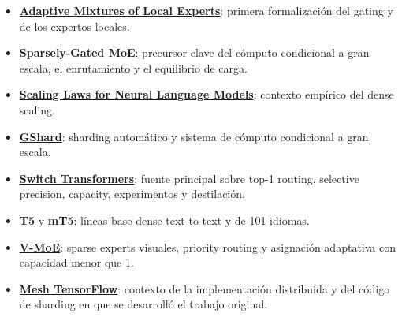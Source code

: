 {\small
\begin{itemize}[nosep,leftmargin=*]
  \item \href{https://doi.org/10.1162/neco.1991.3.1.79}{\textbf{Adaptive Mixtures of Local Experts}}: primera formalización del gating y de los expertos locales.
  \item \href{https://arxiv.org/abs/1701.06538}{\textbf{Sparsely-Gated MoE}}: precursor clave del cómputo condicional a gran escala, el enrutamiento y el equilibrio de carga.
  \item \href{https://arxiv.org/abs/2001.08361}{\textbf{Scaling Laws for Neural Language Models}}: contexto empírico del dense scaling.
  \item \href{https://arxiv.org/abs/2006.16668}{\textbf{GShard}}: sharding automático y sistema de cómputo condicional a gran escala.
  \item \href{https://arxiv.org/abs/2101.03961}{\textbf{Switch Transformers}}: fuente principal sobre top-1 routing, selective precision, capacity, experimentos y destilación.
  \item \href{https://arxiv.org/abs/1910.10683}{\textbf{T5}} y \href{https://arxiv.org/abs/2010.11934}{\textbf{mT5}}: líneas base dense text-to-text y de 101 idiomas.
  \item \href{https://arxiv.org/abs/2106.05974}{\textbf{V-MoE}}: sparse experts visuales, priority routing y asignación adaptativa con capacidad menor que 1.
  \item \href{https://github.com/tensorflow/mesh}{\textbf{Mesh TensorFlow}}: contexto de la implementación distribuida y del código de sharding en que se desarrolló el trabajo original.
\end{itemize}
}


